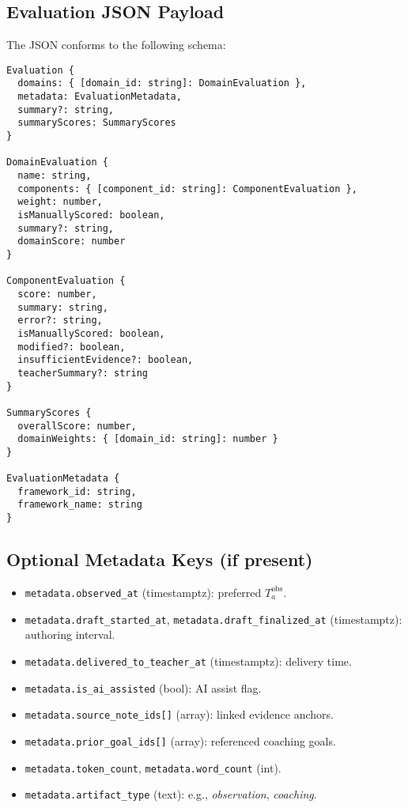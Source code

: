 \documentclass[11pt]{article}
\begin{document}
\subsection{Evaluation JSON Payload}\label{sec:json}
The JSON conforms to the following schema:
\begin{verbatim}
Evaluation {
  domains: { [domain_id: string]: DomainEvaluation },
  metadata: EvaluationMetadata,
  summary?: string,
  summaryScores: SummaryScores
}

DomainEvaluation {
  name: string,
  components: { [component_id: string]: ComponentEvaluation },
  weight: number,
  isManuallyScored: boolean,
  summary?: string,
  domainScore: number
}

ComponentEvaluation {
  score: number,
  summary: string,
  error?: string,
  isManuallyScored: boolean,
  modified?: boolean,
  insufficientEvidence?: boolean,
  teacherSummary?: string
}

SummaryScores {
  overallScore: number,
  domainWeights: { [domain_id: string]: number }
}

EvaluationMetadata {
  framework_id: string,
  framework_name: string
}
\end{verbatim}

\subsection{Optional Metadata Keys (if present)}
\begin{itemize}[leftmargin=2em]
  \item \texttt{metadata.observed\_at} (timestamptz): preferred $T^{\mathrm{obs}}_a$.
  \item \texttt{metadata.draft\_started\_at}, \texttt{metadata.draft\_finalized\_at} (timestamptz): authoring interval.
  \item \texttt{metadata.delivered\_to\_teacher\_at} (timestamptz): delivery time.
  \item \texttt{metadata.is\_ai\_assisted} (bool): AI assist flag.
  \item \texttt{metadata.source\_note\_ids[]} (array): linked evidence anchors.
  \item \texttt{metadata.prior\_goal\_ids[]} (array): referenced coaching goals.
  \item \texttt{metadata.token\_count}, \texttt{metadata.word\_count} (int).
  \item \texttt{metadata.artifact\_type} (text): e.g., \emph{observation}, \emph{coaching}.
\end{itemize}
\end{document}
